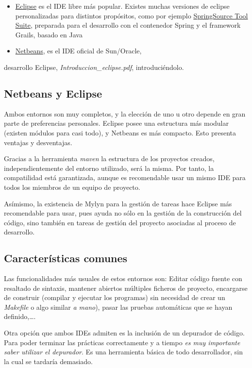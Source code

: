 \documentclass[11pt]{article}
\begin{document}
\begin{itemize} \item \href{http://eclipse.org/}{Eclipse} es el IDE libre más
popular. Existes muchas versiones de eclipse personalizadas para distintos
propósitos, como por ejemplo \href{http://www.springsource.org}{SpringSource
Tool Suite}, preparada para el desarrollo con el contenedor Spring y el
framework Grails, basado en Java \item \href{http://netbeans.org/}{Netbeans}, es
el IDE oficial de Sun/Oracle, \end{itemize}

desarrollo Eclipse, \emph{Introduccion\_{}eclipse.pdf}, introduciéndolo.

\subsection{Netbeans y Eclipse} \label{sec-3-1} Ambos entornos son muy
completos, y la elección de uno u otro depende en gran parte de preferencias
personales. Eclipse posee una estructura más modular (existen módulos para casi
todo), y Netbeans es más compacto. Esto presenta ventajas y desventajas.

Gracias a la herramienta \emph{maven} la estructura de los proyectos creados,
independientemente del entorno utilizado, será la misma. Por tanto, la
compatilidad está garantizada, aunque es recomendable usar un mismo IDE para
todos los miembros de un equipo de proyecto.

Asímismo, la existencia de Mylyn para la gestión de tareas hace Eclipse más
recomendable para usar, pues ayuda no sólo en la gestión de la construcción del
código, sino también en tareas de gestión del proyecto asociadas al proceso de
desarrollo.
 
\subsection{Características comunes} \label{sec-3-2} Las funcionalidades más
usuales de estos entornos son: Editar código fuente con resaltado de sintaxis,
mantener abiertos múltiples ficheros de proyecto, encargarse de construir
(compilar y ejecutar los programas) sin necesidad de crear un \emph{Makefile} o
algo similar \emph{a mano}), pasar las pruebas automáticas que se hayan
definido,\ldots{}.

Otra opción que ambos IDEs admiten es la inclusión de un depurador de código.
Para poder terminar las prácticas correctamente y a tiempo \emph{es muy
importante saber utilizar el depurador}. Es una herramienta básica de todo
desarrollador, sin la cual se tardaría demasiado.
\end{document}

